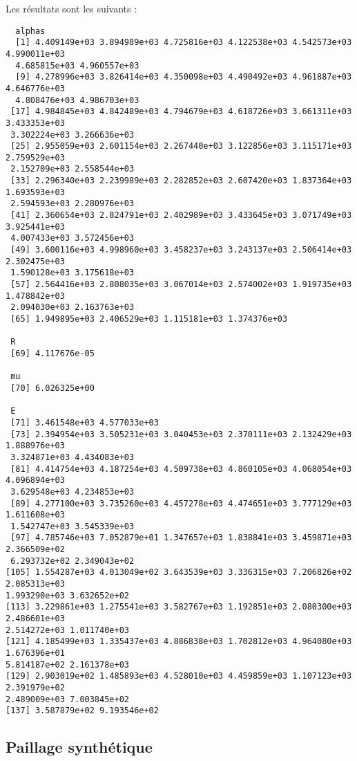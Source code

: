 \documentclass[a4paper, 11pt]{article}
\begin{document}
Les résultats sont les suivants :
\begin{verbatim}
  alphas
  [1] 4.409149e+03 3.894989e+03 4.725816e+03 4.122538e+03 4.542573e+03 4.990011e+03
  4.685815e+03 4.960557e+03
  [9] 4.278996e+03 3.826414e+03 4.350098e+03 4.490492e+03 4.961887e+03 4.646776e+03
  4.808476e+03 4.986703e+03
 [17] 4.984845e+03 4.842489e+03 4.794679e+03 4.618726e+03 3.661311e+03 3.433353e+03
 3.302224e+03 3.266636e+03
 [25] 2.955059e+03 2.601154e+03 2.267440e+03 3.122856e+03 3.115171e+03 2.759529e+03
 2.152709e+03 2.558544e+03
 [33] 2.296340e+03 2.239989e+03 2.282852e+03 2.607420e+03 1.837364e+03 1.693593e+03 
 2.594593e+03 2.280976e+03
 [41] 2.360654e+03 2.824791e+03 2.402989e+03 3.433645e+03 3.071749e+03 3.925441e+03 
 4.007433e+03 3.572456e+03
 [49] 3.600116e+03 4.998960e+03 3.458237e+03 3.243137e+03 2.506414e+03 2.302475e+03
 1.590128e+03 3.175618e+03
 [57] 2.564416e+03 2.808035e+03 3.067014e+03 2.574002e+03 1.919735e+03 1.478842e+03
 2.094030e+03 2.163763e+03
 [65] 1.949895e+03 2.406529e+03 1.115181e+03 1.374376e+03 
 
 R
 [69] 4.117676e-05
 
 mu
 [70] 6.026325e+00
 
 E
 [71] 3.461548e+03 4.577033e+03
 [73] 2.394954e+03 3.505231e+03 3.040453e+03 2.370111e+03 2.132429e+03 1.888976e+03 
 3.324871e+03 4.434083e+03
 [81] 4.414754e+03 4.187254e+03 4.509738e+03 4.860105e+03 4.068054e+03 4.096894e+03 
 3.629548e+03 4.234853e+03
 [89] 4.277100e+03 3.735260e+03 4.457278e+03 4.474651e+03 3.777129e+03 1.611608e+03 
 1.542747e+03 3.545339e+03
 [97] 4.785746e+03 7.052879e+01 1.347657e+03 1.838841e+03 3.459871e+03 2.366509e+02 
 6.293732e+02 2.349043e+02
[105] 1.554287e+03 4.013049e+02 3.643539e+03 3.336315e+03 7.206826e+02 2.085313e+03 
1.993290e+03 3.632652e+02
[113] 3.229861e+03 1.275541e+03 3.582767e+03 1.192851e+03 2.080300e+03 2.486601e+03
2.514272e+03 1.011740e+03
[121] 4.185499e+03 1.335437e+03 4.886838e+03 1.702812e+03 4.964080e+03 1.676396e+01
5.814187e+02 2.161378e+03
[129] 2.903019e+02 1.485893e+03 4.528010e+03 4.459859e+03 1.107123e+03 2.391979e+02 
2.489009e+03 7.003845e+02
[137] 3.587879e+02 9.193546e+02
\end{verbatim}

\begin{figure}[ht]
 \centering
 \caption{}
\end{figure}

\newpage
\subsection{Paillage synthétique}
\end{document}

